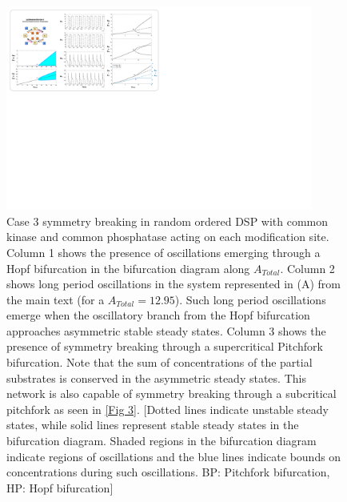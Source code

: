 \documentclass[16pt, a4paper]{article}
\begin{document}
\clearpage
\begin{figure}[ht!]
    \centering
    \includegraphics[width = 0.9\textwidth, keepaspectratio]{FigS02.pdf}
    \caption{Case 3 symmetry breaking in random ordered DSP with common kinase and common phosphatase acting on each modification site.
    Column 1 shows the presence of oscillations emerging through a Hopf bifurcation in the bifurcation diagram along $A_{Total}$. 
    Column 2 shows long period oscillations in the system represented in (A) from the main text (for a $A_{Total} = 12.95$). Such long period oscillations emerge when the oscillatory branch from the Hopf bifurcation approaches asymmetric stable steady states.  
    Column 3 shows the presence of symmetry breaking through a supercritical Pitchfork bifurcation. Note that the sum of concentrations of the partial substrates is conserved in the asymmetric steady states. This network is also capable of symmetry breaking through a subcritical pitchfork as seen in \cref{Fig 3}.
    [Dotted lines indicate unstable steady states, while solid lines represent stable steady states in the bifurcation diagram. Shaded regions in the bifurcation diagram indicate regions of oscillations and the blue lines indicate bounds on concentrations during such oscillations. BP: Pitchfork bifurcation, HP: Hopf bifurcation]}
    \label{Fig S2}
\end{figure}
\end{document}
